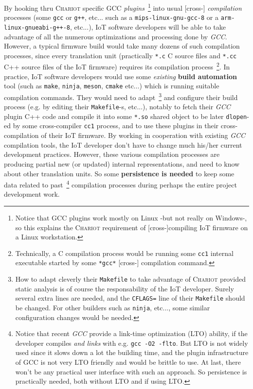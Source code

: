By hooking thru \textsc{Chariot} specific GCC
\emph{plugins}~\footnote{Notice that GCC plugins work mostly on Linux
  -but not really on Windows-, so this explains the \textsc{Chariot}
  requirement of [cross-]compiling IoT firmware on a Linux
  workstation.}  into usual [cross-] \emph{compilation} processes
(some \texttt{gcc} or \texttt{g++}, etc... such as a
\texttt{mips-linux-gnu-gcc-8} or a \texttt{arm-linux-gnueabi-g++-8},
etc...), IoT software developers will be able to take advantage of all
the numerous optimizations and processing done by \emph{GCC}. However,
a typical firmware build would take many dozens of such compilation
processes, since every translation unit (practically \texttt{*.c} C
source files and \texttt{*.cc} C++ source files of the IoT firmware)
requires its compilation process~\footnote{Technically, a C
  compilation process would be running some \texttt{cc1} internal
  executable started by some \texttt{*gcc*} [cross-] compilation
  command.}. In practice, IoT software developers would use some
\emph{existing} \textbf{build automation} tool (such as \texttt{make},
\texttt{ninja}, \texttt{meson}, \texttt{cmake} etc...)   which is running suitable compilation commands. They
would need to adapt~\footnote{How to adapt cleverly their
  \texttt{Makefile} to take advantage of \textsc{Chariot} provided
  static analysis is of course the responsability of the IoT
  developer. Surely several extra lines are needed, and the
  \texttt{CFLAGS=} line of their \texttt{Makefile} should be
  changed. For other builders such as \texttt{ninja}, etc..., some
  similar configuration changes would be needed.}  and configure their
build process (e.g. by editing their \texttt{Makefile}-s, etc...),
notably to fetch their \emph{GCC} plugin C++ code and compile it into
some \texttt{*.so} shared object to be later \texttt{dlopen}-ed by
some cross-compiler \texttt{cc1} process, and to use these plugins in
their cross-compilation of their IoT firmware. By working in
cooperation with existing \emph{GCC} compilation tools, the IoT
developer don't have to change much his/her current development
practices. However, these various compilation processes are producing
partial new (or updated) internal representations, and need to know
about other translation units. So some \textbf{persistence is needed}
to keep some data related to past~\footnote{Notice that recent
  \emph{GCC} provide a link-time optimization (LTO) ability, if the
  developer compiles \emph{and links} with e.g. \texttt{gcc -O2
    -flto}. But LTO is not widely used since it slows down a lot the
  building time, and the plugin infrastructure of GCC is not very LTO
  friendly and would be brittle to use. At last, there won't be any
  practical user interface with such an approach. So persistence is
  practically needed, both without LTO and if using LTO.}  compilation
processes during perhaps the entire project development work.

